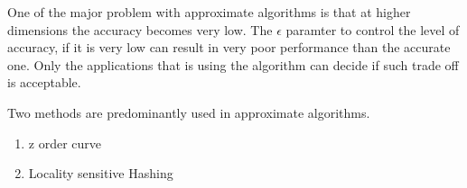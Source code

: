 \medskip

One of the major problem with approximate algorithms is that at higher
dimensions the accuracy becomes very low. The $\epsilon$ paramter to
control the level of accuracy, if it is very low can result in very
poor performance than the accurate one. Only the applications that is
using the algorithm can decide if such trade off is acceptable.

\medskip

Two methods are predominantly
used in approximate algorithms.
\begin{enumerate}
\item z order curve
\item Locality sensitive Hashing
\end{enumerate}

\bigskip
